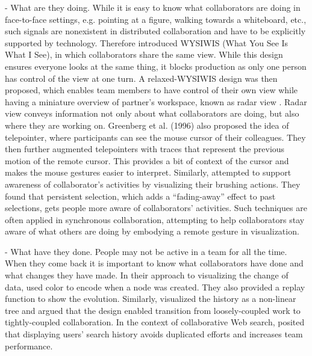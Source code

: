 - What are they doing. While it is easy to know what collaborators are doing in face-to-face settings, e.g. pointing at a figure, walking towards a whiteboard, etc., such signals are nonexistent in distributed collaboration and have to be explicitly supported by technology. Therefore \cite{stefik1987wysiwis} introduced WYSIWIS (What You See Is What I See), in which collaborators share the same view. While this design ensures everyone looks at the same thing, it blocks production as only one person has control of the view at one turn. A relaxed-WYSIWIS design \citep{Gutwin1998h} was then proposed, which enables team members to have control of their own view while having a miniature overview of partner’s workspace, known as radar view \citep{Gutwin1996}. Radar view conveys information not only about what collaborators are doing, but also where they are working on. Greenberg et al. (1996) also proposed the idea of telepointer, where participants can see the mouse cursor of their colleagues. They then further augmented telepointers with traces that represent the previous motion of the remote cursor. This provides a bit of context of the cursor and makes the mouse gestures easier to interpret. Similarly, \cite{Hajizadeh2013} attempted to support awareness of collaborator’s activities by visualizing their brushing actions. They found that persistent selection, which adds a “fading-away” effect to past selections, gets people more aware of collaborators’ activities. Such techniques are often applied in synchronous collaboration, attempting to help collaborators stay aware of what others are doing by embodying a remote gesture in visualization.

- What have they done. People may not be active in a team for all the time. When they come back it is important to know what collaborators have done and what changes they have made. In their approach to visualizing the change of data, \cite{Schumann2013a} used color to encode when a node was created. They also provided a replay function to show the evolution. Similarly, \cite{Edwards1997i} visualized the history as a non-linear tree and argued that the design enabled transition from loosely-coupled work to tightly-coupled collaboration. In the context of collaborative Web search, \cite{Paul2010} posited that displaying users’ search history avoids duplicated efforts and increases team performance. 

